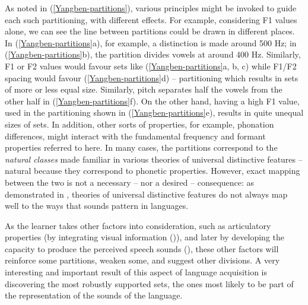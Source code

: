 As noted in (\ref{Yangben-partitions}), various principles might be invoked to guide each such partitioning, with different effects. For example, considering F1 values alone, we can see the line between partitions could be drawn in different places. In (\ref{Yangben-partitions}a), for example, a distinction is made around 500 Hz; in (\ref{Yangben-partitions}b), the partition divides vowels at around 400 Hz. Similarly, F1 or F2 values would favour sets like (\ref{Yangben-partitions}a, b, c) while F1/F2 spacing would favour  (\ref{Yangben-partitions}d) -- partitioning which results in sets of more or less equal size.  Similarly, pitch separates half the vowels from the other half in (\ref{Yangben-partitions}f). On the other hand, having a high F1 value, used in the partitioning shown in (\ref{Yangben-partitions}e), results in quite unequal sizes of sets. In addition, other sorts of properties, for example, phonation differences, might interact with the fundamental frequency and formant properties referred to here. In many cases, the partitions correspond to the \textit{natural classes} made familiar in various theories of universal distinctive features -- natural because they correspond to phonetic properties. However, exact mapping between the two is not a necessary -- nor a desired -- consequence: as demonstrated in \citet{Mielke:2008}, theories of universal distinctive features do not always map well to the ways that sounds pattern in languages. 

As the learner takes other factors  into consideration, such as articulatory properties (by integrating visual information (\citealt{Rosenblum+:1997, Teinonen+:2008, Coulon+:2013})), and later by developing the capacity to produce the perceived speech sounds (\citealt{DePaolis+:2011, Tenenbaum+:2013, Yeung+:2013}), these other factors will reinforce some partitions, weaken some, and suggest other divisions.  A very interesting and important result of this aspect of language acquisition is discovering  the most robustly supported sets, the ones most likely to be part of the representation of the sounds of the language. 

